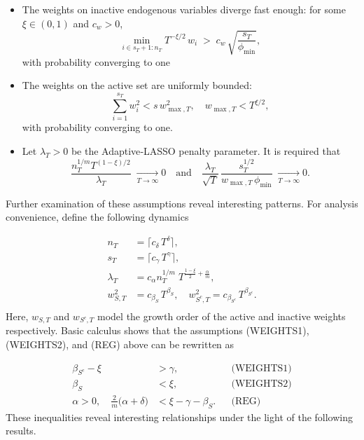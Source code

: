 \documentclass[10pt,a4paper,oneside]{article}
\begin{document}
\begin{itemize}
\begin{enumerate}
    \end{enumerate}

  \item[(WEIGHTS1)] The weights on inactive endogenous variables diverge fast enough: for some $\xi\in(0,1)$ and $c_w>0$,
  \[
    \min_{i \in s_T + 1 : n_T} T^{-\xi/2}\,w_i \;>\; c_w\,\sqrt{\frac{s_T}{\phi_{\min}}},
  \]
  with probability converging to one
  \item[(WEIGHTS2)] The weights on the active set are uniformly bounded: 
  \[
     \sum_{i=1}^{s_T} w_i^2 < s\,w_{\max, T}^2,\quad w_{\max, T}<T^{\xi/2},
  \]
  with probability converging to one.
\end{itemize}

\begin{itemize}
    \item[(REG)] Let $\lambda_T>0$ be the Adaptive‐LASSO penalty parameter.  It is required that
\[
   \frac{n_T^{1/m}T^{(1-\xi)/2}}{\lambda_T}\;\xrightarrow[T \to \infty]{} 0
   \quad\text{and}\quad
   \frac{\lambda_T}{\sqrt{T}}\,\frac{s_T^{1/2}}{w_{\max, T}\,\phi_{\min}}\; \xrightarrow[T \to \infty]{} 0.
\]
\end{itemize}

Further examination of these assumptions reveal interesting patterns. For analysis convenience, define the following dynamics

\begin{align*}
n_T &= \lceil c_{\delta}\,T^{\delta} \rceil, \\[6pt]
s_T &= \lceil c_{\gamma}\,T^{\gamma} \rceil, \\[6pt]
\lambda_T &= c_{\alpha} n_T^{1/m}\;T^{\frac{1-\xi}{2} + \frac{\alpha}{m}}, \\[6pt]
w_{S,T}^2 &= c_{\beta_S}\,T^{\beta_S}, 
\quad
w_{S^c,T}^2 = c_{\beta_{S^c}}\,T^{\beta_{S^c}}.
\\[4pt]
\end{align*}
Here, $w_{S,T}$ and $w_{S^c,T}$ model the growth order of the active and inactive weights respectively. Basic calculus shows that the assumptions (WEIGHTS1), (WEIGHTS2), and (REG) above can be rewritten as

\begin{align*}
\beta_{S^c} - \xi &> \gamma, 
  &&\text{(WEIGHTS1)}\\
\beta_S &< \xi, 
  &&\text{(WEIGHTS2)}\\
\alpha > 0,\quad 
\frac{2}{m}\bigl(\alpha + \delta\bigr) &< \xi - \gamma - \beta_S. 
  &&\text{(REG)}
\end{align*}
These inequalities reveal interesting relationships under the light of the following results.
\end{document}

